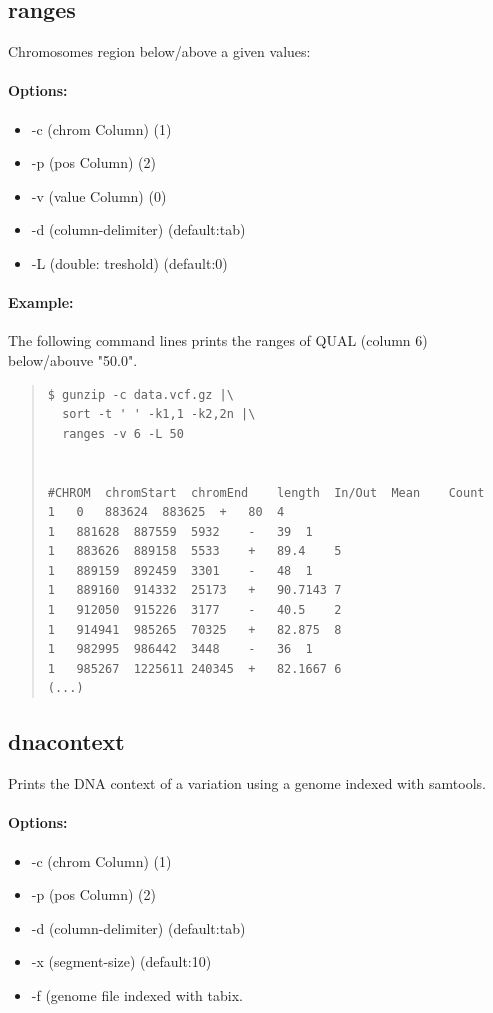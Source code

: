 \documentclass[12pt]{article}
\begin{document}
\subsection{ranges}
Chromosomes region below/above a given values:
\paragraph{Options:}
\begin{itemize}
\item-c (chrom Column) (1)
\item-p (pos Column) (2)
\item-v (value Column) (0)
\item-d (column-delimiter) (default:tab)
\item-L (double: treshold) (default:0)
\end{itemize}
\paragraph{Example:}
The following command lines prints the ranges of QUAL (column 6) below/abouve "50.0".

\begin{quote}
\begin{verbatim}
$ gunzip -c data.vcf.gz |\
  sort -t ' ' -k1,1 -k2,2n |\
  ranges -v 6 -L 50 


#CHROM	chromStart	chromEnd	length	In/Out	Mean	Count
1	0	883624	883625	+	80	4
1	881628	887559	5932	-	39	1
1	883626	889158	5533	+	89.4	5
1	889159	892459	3301	-	48	1
1	889160	914332	25173	+	90.7143	7
1	912050	915226	3177	-	40.5	2
1	914941	985265	70325	+	82.875	8
1	982995	986442	3448	-	36	1
1	985267	1225611	240345	+	82.1667	6
(...)
\end{verbatim}
\end{quote}

\subsection{dnacontext}
Prints the DNA context of a variation using a genome indexed with samtools.
\paragraph{Options:}
\begin{itemize}
\item-c (chrom Column) (1)
\item-p (pos Column) (2)
\item-d (column-delimiter) (default:tab)
\item-x (segment-size) (default:10)
\item-f (genome file indexed with tabix.
\end{itemize}
\end{document}
